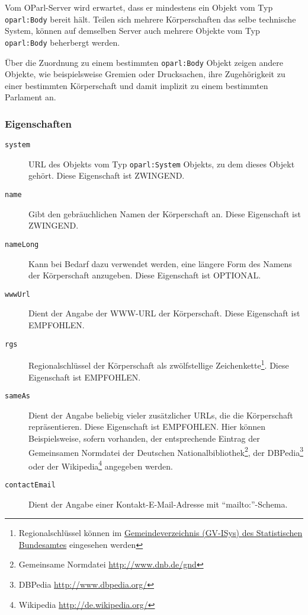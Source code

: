 \documentclass[,a4paper]{article}
\begin{document}
Vom OParl-Server wird erwartet, dass er mindestens ein Objekt vom Typ
\texttt{oparl:Body} bereit hält. Teilen sich mehrere Körperschaften das
selbe technische System, können auf demselben Server auch mehrere
Objekte vom Typ \texttt{oparl:Body} beherbergt werden.

Über die Zuordnung zu einem bestimmten \texttt{oparl:Body} Objekt zeigen
andere Objekte, wie beispielsweise Gremien oder Drucksachen, ihre
Zugehörigkeit zu einer bestimmten Körperschaft und damit implizit zu
einem bestimmten Parlament an.

\subsubsection{Eigenschaften}\label{eigenschaften-1}

\begin{description}
\item[\texttt{system}]
URL des Objekts vom Typ \texttt{oparl:System} Objekts, zu dem dieses
Objekt gehört. Diese Eigenschaft ist ZWINGEND.
\item[\texttt{name}]
Gibt den gebräuchlichen Namen der Körperschaft an. Diese Eigenschaft ist
ZWINGEND.
\item[\texttt{nameLong}]
Kann bei Bedarf dazu verwendet werden, eine längere Form des Namens der
Körperschaft anzugeben. Diese Eigenschaft ist OPTIONAL.
\item[\texttt{wwwUrl}]
Dient der Angabe der WWW-URL der Körperschaft. Diese Eigenschaft ist
EMPFOHLEN.
\item[\texttt{rgs}]
Regionalschlüssel der Körperschaft als zwölfstellige
Zeichenkette\footnote{Regionalschlüssel können im
  \href{https://www.destatis.de/DE/ZahlenFakten/LaenderRegionen/Regionales/Gemeindeverzeichnis/Gemeindeverzeichnis.html}{Gemeindeverzeichnis
  (GV-ISys) des Statistischen Bundesamtes} eingesehen werden}. Diese
Eigenschaft ist EMPFOHLEN.
\item[\texttt{sameAs}]
Dient der Angabe beliebig vieler zusätzlicher URLs, die die Körperschaft
repräsentieren. Diese Eigenschaft ist EMPFOHLEN. Hier können
Beispielsweise, sofern vorhanden, der entsprechende Eintrag der
Gemeinsamen Normdatei der Deutschen Nationalbibliothek\footnote{Gemeinsame
  Normdatei \url{http://www.dnb.de/gnd}}, der DBPedia\footnote{DBPedia
  \url{http://www.dbpedia.org/}} oder der Wikipedia\footnote{Wikipedia
  \url{http://de.wikipedia.org/}} angegeben werden.
\item[\texttt{contactEmail}]
Dient der Angabe einer Kontakt-E-Mail-Adresse mit ``mailto:''-Schema.

\end{description}
\end{document}
